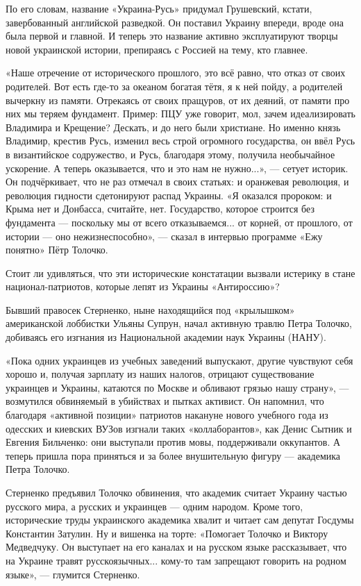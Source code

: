 По его словам, название «Украина-Русь» придумал Грушевский, кстати,
завербованный английской разведкой. Он поставил Украину впереди, вроде она была
первой и главной. И теперь это название активно эксплуатируют творцы новой
украинской истории, препираясь с Россией на тему, кто главнее.

«Наше отречение от исторического прошлого, это всё равно, что отказ от своих
родителей. Вот есть где-то за океаном богатая тётя, я к ней пойду, а родителей
вычеркну из памяти. Отрекаясь от своих пращуров, от их деяний, от памяти про
них мы теряем фундамент. Пример: ПЦУ уже говорит, мол, зачем идеализировать
Владимира и Крещение? Дескать, и до него были христиане. Но именно князь
Владимир, крестив Русь, изменил весь строй огромного государства, он ввёл Русь
в византийское содружество, и Русь, благодаря этому, получила необычайное
ускорение. А теперь оказывается, что и это нам не нужно...», — сетует историк.
Он подчёркивает, что не раз отмечал в своих статьях: и оранжевая революция, и
революция гидности сдетонируют распад Украины. «Я оказался пророком: и Крыма
нет и Донбасса, считайте, нет. Государство, которое строится без фундамента —
поскольку мы от всего отказываемся... от корней, от прошлого, от истории — оно
нежизнеспособно», — сказал в интервью программе «Ежу понятно» Пётр Толочко.

Стоит ли удивляться, что эти исторические констатации вызвали истерику в стане
национал-патриотов, которые лепят из Украины «Антироссию»?

Бывший правосек Стерненко, ныне находящийся под «крылышком» американской
лоббистки Ульяны Супрун, начал активную травлю Петра Толочко, добиваясь его
изгнания из Национальной академии наук Украины (НАНУ).

«Пока одних украинцев из учебных заведений выпускают, другие чувствуют себя
хорошо и, получая зарплату из наших налогов, отрицают существование украинцев и
Украины, катаются по Москве и обливают грязью нашу страну», — возмутился
обвиняемый в убийствах и пытках активист. Он напомнил, что благодаря «активной
позиции» патриотов накануне нового учебного года из одесских и киевских ВУЗов
изгнали таких «коллаборантов», как Денис Сытник и Евгения Бильченко: они
выступали против мовы, поддерживали оккупантов. А теперь пришла пора приняться
и за более внушительную фигуру — академика Петра Толочко.

Стерненко предъявил Толочко обвинения, что академик считает Украину частью
русского мира, а русских и украинцев — одним народом. Кроме того, исторические
труды украинского академика хвалит и читает сам депутат Госдумы Константин
Затулин. Ну и вишенка на торте: «Помогает Толочко и Виктору Медведчуку. Он
выступает на его каналах и на русском языке рассказывает, что на Украине травят
русскоязычных... кому-то там запрещают говорить на родном языке», — глумится
Стерненко.

